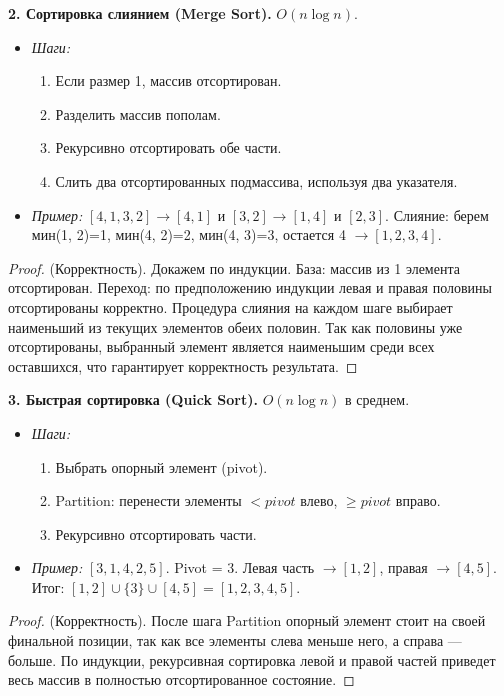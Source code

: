 \documentclass[12pt, a4paper]{article}
\begin{document}
\textbf{2. Сортировка слиянием (Merge Sort).} $O(n \log n)$.
\begin{itemize}
    \item \textit{Шаги:}
    \begin{enumerate}
        \item Если размер 1, массив отсортирован.
        \item Разделить массив пополам.
        \item Рекурсивно отсортировать обе части.
        \item Слить два отсортированных подмассива, используя два указателя.
    \end{enumerate}
    \item \textit{Пример:} $[4, 1, 3, 2] \to [4, 1]$ и $[3, 2] \to[1, 4]$ и $[2, 3]$. Слияние: берем мин(1, 2)=1, мин(4, 2)=2, мин(4, 3)=3, остается 4 $\to[1, 2, 3, 4]$.
\end{itemize}
\begin{proof}
(Корректность). Докажем по индукции. База: массив из 1 элемента отсортирован. Переход: по предположению индукции левая и правая половины отсортированы корректно. Процедура слияния на каждом шаге выбирает наименьший из текущих элементов обеих половин. Так как половины уже отсортированы, выбранный элемент является наименьшим среди всех оставшихся, что гарантирует корректность результата.
\end{proof}

\textbf{3. Быстрая сортировка (Quick Sort).} $O(n \log n)$ в среднем.
\begin{itemize}
    \item \textit{Шаги:}
    \begin{enumerate}
        \item Выбрать опорный элемент (pivot).
        \item Partition: перенести элементы $< pivot$ влево, $\ge pivot$ вправо.
        \item Рекурсивно отсортировать части.
    \end{enumerate}
    \item \textit{Пример:} $[3, 1, 4, 2, 5]$. Pivot = 3. Левая часть $\to[1, 2]$, правая $\to [4, 5]$. Итог: $[1, 2] \cup \{3\} \cup [4, 5] = [1, 2, 3, 4, 5]$.
\end{itemize}
\begin{proof}
(Корректность). После шага Partition опорный элемент стоит на своей финальной позиции, так как все элементы слева меньше него, а справа --- больше. По индукции, рекурсивная сортировка левой и правой частей приведет весь массив в полностью отсортированное состояние.
\end{proof}
\end{document}
